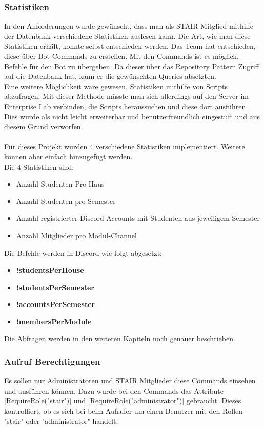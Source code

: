 \documentclass[a4paper, table]{article}
\begin{document}
\subsubsection{Statistiken}
In den Anforderungen wurde gewünscht, dass man als STAIR Mitglied mithilfe der Datenbank verschiedene Statistiken auslesen kann.
Die Art, wie man diese Statistiken erhält, konnte selbst entschieden werden.
Das Team hat entschieden, diese über Bot Commands zu erstellen.
Mit den Commands ist es möglich, Befehle für den Bot zu übergeben.
Da dieser über das Repository Pattern Zugriff auf die Datenbank hat, kann er die gewünschten Queries absetzten.\\
Eine weitere Möglichkeit wäre gewesen,  Statistiken mithilfe von Scripts abzufragen.
Mit dieser Methode müsste man sich allerdings auf den Server im Enterprise Lab verbinden, die Scripts heraussuchen und diese dort ausführen.
Dies wurde als nicht leicht erweiterbar und benutzerfreundlich eingestuft und aus diesem Grund verworfen.\\\\
Für dieses Projekt wurden 4 verschiedene Statistiken implementiert.
Weitere können aber einfach hinzugefügt werden.\\
Die 4 Statistiken sind:
\begin{itemize}
    \item Anzahl Studenten Pro Haus
    \item Anzahl Studenten pro Semester
    \item Anzahl registrierter Discord Accounts mit Studenten aus jeweiligem Semester
    \item Anzahl Mitglieder pro Modul-Channel
\end{itemize}
Die Befehle werden in Discord wie folgt abgesetzt:
\begin{itemize}
    \item \textbf{!studentsPerHouse}
    \item \textbf{!studentsPerSemester}
    \item \textbf{!accountsPerSemester}
    \item \textbf{!membersPerModule}
\end{itemize}
Die Abfragen werden in den weiteren Kapiteln noch genauer beschrieben.

\subsubsection*{Aufruf Berechtigungen}
Es sollen nur Administratoren und STAIR Mitglieder diese Commands einsehen und ausführen können.
Dazu wurde bei den Commands das Attribute [RequireRole("stair")] und [RequireRole("administrator")] gebraucht.
Dieses kontrolliert, ob es sich bei beim Aufrufer um einen Benutzer mit den Rollen "stair" oder "administrator" handelt.
\end{document}
